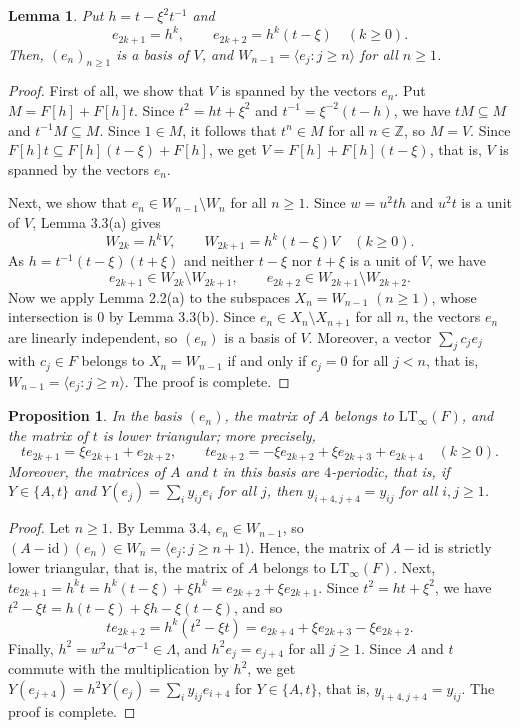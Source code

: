 \documentclass[11pt,reqno,a4paper]{amsart}
\numberwithin{equation}{section}
\newtheorem{lemma}[theorem]{Lemma}
\newtheorem{proposition}[theorem]{Proposition}
\theoremstyle{definition}
\theoremstyle{plain}
\newcommand{\id}{\mathrm{id}}
\newcommand{\LT}{\mathrm{LT}_{\infty}}
\newcommand{\bbZ}{\mathbb Z}
\newcommand{\spann}[1]{\langle #1\rangle}
\begin{document}
\begin{lemma}
Put $h=t-\xi^2t^{-1}$ and
\[
e_{2k+1}=h^k,\qquad e_{2k+2}=h^k(t-\xi)\quad(k\ge0).
\]
Then, $(e_n)_{n\ge1}$ is a basis of $V$, and $W_{n-1}=\spann{e_j:j\ge n}$ for all $n\ge1$.
\end{lemma}
\begin{proof}
First of all, we show that $V$ is spanned by the vectors $e_n$. Put $M=F[h]+F[h]t$. Since $t^2=ht+\xi^2$ and $t^{-1}=\xi^{-2}(t-h)$, we have $tM\subseteq M$ and $t^{-1}M\subseteq M$. Since $1\in M$, it follows that $t^n\in M$ for all $n\in\bbZ$, so $M=V$. Since $F[h]t\subseteq F[h](t-\xi)+F[h]$, we get $V=F[h]+F[h](t-\xi)$, that is, $V$ is spanned by the vectors $e_n$.

Next, we show that $e_n\in W_{n-1}\setminus W_n$ for all $n\ge1$. Since $w=u^2th$ and $u^2t$ is a unit of $V$, Lemma 3.3(a) gives
\[
W_{2k}=h^kV,\qquad W_{2k+1}=h^k(t-\xi)V\quad(k\ge0).
\]
As $h=t^{-1}(t-\xi)(t+\xi)$ and neither $t-\xi$ nor $t+\xi$ is a unit of $V$, we have
\[
e_{2k+1}\in W_{2k}\setminus W_{2k+1},\qquad
e_{2k+2}\in W_{2k+1}\setminus W_{2k+2}.
\]
Now we apply Lemma 2.2(a) to the subspaces $X_n=W_{n-1}$ $(n\ge1)$, whose intersection is $0$ by Lemma 3.3(b). Since $e_n\in X_n\setminus X_{n+1}$ for all $n$, the vectors $e_n$ are linearly independent, so $(e_n)$ is a basis of $V$. Moreover, a vector $\sum_j c_je_j$ with $c_j\in F$ belongs to $X_n=W_{n-1}$ if and only if $c_j=0$ for all $j<n$, that is, $W_{n-1}=\spann{e_j:j\ge n}$. The proof is complete.
\end{proof}

\begin{proposition}
In the basis $(e_n)$, the matrix of $A$ belongs to $\LT(F)$, and the matrix of $t$ is lower triangular; more precisely,
\[
te_{2k+1}=\xi e_{2k+1}+e_{2k+2},\qquad
te_{2k+2}=-\xi e_{2k+2}+\xi e_{2k+3}+e_{2k+4}\quad(k\ge0).
\]
Moreover, the matrices of $A$ and $t$ in this basis are $4$-periodic, that is, if $Y\in\{A,t\}$ and $Y(e_j)=\sum_i y_{ij}e_i$ for all $j$, then $y_{i+4,j+4}=y_{ij}$ for all $i,j\ge1$.
\end{proposition}
\begin{proof}
Let $n\ge1$. By Lemma 3.4, $e_n\in W_{n-1}$, so $(A-\id)(e_n)\in W_n=\spann{e_j:j\ge n+1}$. Hence, the matrix of $A-\id$ is strictly lower triangular, that is, the matrix of $A$ belongs to $\LT(F)$. Next, $te_{2k+1}=h^kt=h^k(t-\xi)+\xi h^k=e_{2k+2}+\xi e_{2k+1}$. Since $t^2=ht+\xi^2$, we have $t^2-\xi t=h(t-\xi)+\xi h-\xi(t-\xi)$, and so
\[
te_{2k+2}=h^k(t^2-\xi t)=e_{2k+4}+\xi e_{2k+3}-\xi e_{2k+2}.
\]
Finally, $h^2=w^2u^{-4}\sigma^{-1}\in\Lambda$, and $h^2e_j=e_{j+4}$ for all $j\ge1$. Since $A$ and $t$ commute with the multiplication by $h^2$, we get $Y(e_{j+4})=h^2Y(e_j)=\sum_i y_{ij}e_{i+4}$ for $Y\in\{A,t\}$, that is, $y_{i+4,j+4}=y_{ij}$. The proof is complete.
\end{proof}
\end{document}
